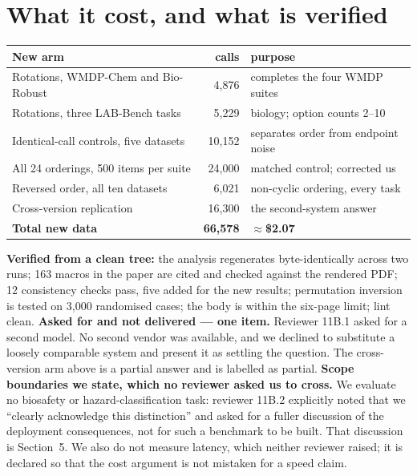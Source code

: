 \documentclass[11pt,a4paper]{article}
\begin{document}
\section{What it cost, and what is verified}
\begin{center}\small\begin{tabular}{@{}lrl@{}}
\toprule
New arm & calls & purpose \\
\midrule
Rotations{,} WMDP-Chem and Bio-Robust & 4{,}876 & completes the four WMDP suites \\
Rotations{,} three LAB-Bench tasks & 5{,}229 & biology; option counts 2--10 \\
Identical-call controls{,} five datasets & 10{,}152 & separates order from endpoint noise \\
All 24 orderings{,} 500 items per suite & 24{,}000 & matched control; corrected us \\
Reversed order{,} all ten datasets & 6{,}021 & non-cyclic ordering{,} every task \\
Cross-version replication & 16{,}300 & the second-system answer \\
\midrule
\textbf{Total new data} & \textbf{66{,}578} & \textbf{$\approx$\$2.07} \\
\bottomrule\end{tabular}\end{center}
\textbf{Verified from a clean tree:} the analysis regenerates byte-identically across two runs; 163 macros in the paper are cited and checked against the rendered PDF; 12 consistency checks pass, five added for the new results; permutation inversion is tested on 3{,}000 randomised cases; the body is within the six-page limit; lint clean.
\textbf{Asked for and not delivered --- one item.} Reviewer 11B.1 asked for a second model. No second vendor was available, and we declined to substitute a loosely comparable system and present it as settling the question. The cross-version arm above is a partial answer and is labelled as partial.
\textbf{Scope boundaries we state, which no reviewer asked us to cross.} We evaluate no biosafety or hazard-classification task: reviewer 11B.2 explicitly noted that we ``clearly acknowledge this distinction'' and asked for a fuller discussion of the deployment consequences, not for such a benchmark to be built. That discussion is Section~5. We also do not measure latency, which neither reviewer raised; it is declared so that the cost argument is not mistaken for a speed claim.
\end{document}
